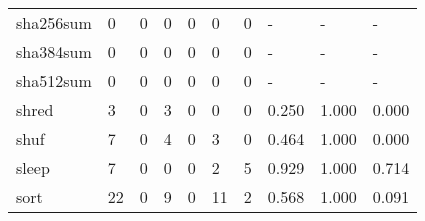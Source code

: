 \begin{longtable}{lp{1.3cm}p{1.3cm}p{1.3cm}p{1.3cm}p{1.3cm}p{1.3cm}p{1.3cm}p{1.3cm}p{1.3cm}}
sha256sum &                      0 &                                  0 &                                 0 &                                0 &                                 0 &                               0 &                                    - &                                      - &                                    - \\
sha384sum &                      0 &                                  0 &                                 0 &                                0 &                                 0 &                               0 &                                    - &                                      - &                                    - \\
sha512sum &                      0 &                                  0 &                                 0 &                                0 &                                 0 &                               0 &                                    - &                                      - &                                    - \\
shred     &                      3 &                                  0 &                                 3 &                                0 &                                 0 &                               0 &                                0.250 &                                  1.000 &                                0.000 \\
shuf      &                      7 &                                  0 &                                 4 &                                0 &                                 3 &                               0 &                                0.464 &                                  1.000 &                                0.000 \\
sleep     &                      7 &                                  0 &                                 0 &                                0 &                                 2 &                               5 &                                0.929 &                                  1.000 &                                0.714 \\
sort      &                     22 &                                  0 &                                 9 &                                0 &                                11 &                               2 &                                0.568 &                                  1.000 &                                0.091 \\

\end{longtable}
